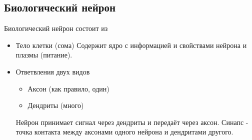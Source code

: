 	    	\subsection{Биологический нейрон}
			Биологический нейрон состоит из
	    		\begin{itemize}
	    		    	\item Тело клетки (сома)
	    				Содержит ядро с информацией и свойствами нейрона и плазмы (питание). 
	    			\item Ответвления двух видов
					\begin{itemize}
						\item Аксон (как правило, один)
						\item Дендриты (много)
					\end{itemize}
					Нейрон принимает сигнал через дендриты и передаёт через аксон. 
					Синапс - точка контакта между аксонами одного нейрона и дендритами другого.
	    			\end{itemize}
			
